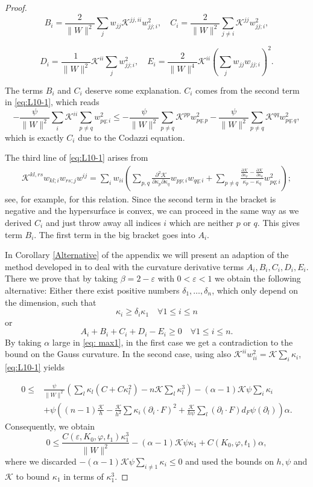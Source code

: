 \documentclass{amsart}
\theoremstyle{definition}
\theoremstyle{remark}
\numberwithin{equation}{section}
\begin{document}
\begin{proof}
\[B_i=\frac{2}{\|W\|^2}\sum_{j}w_{jj}\mathcal{K}^{jj,ii}w^2_{jj;i},\quad C_i=\frac{2}{\|W\|^2}\sum_{j\neq i}\mathcal{K}^{jj}w_{jj;i}^2,\]

\[D_i=\frac{1}{\|W\|^2}\mathcal{K}^{ii}\sum_j w_{jj;i}^2,\quad
E_i=\frac{2}{\|W\|^4}\mathcal{K}^{ii}\left(\sum_j w_{jj}w_{jj;i}\right)^2.\]

The terms $B_i$ and $C_i$ deserve some explanation. $C_i$ comes from the second term in \eqref{eq:L10-1}, which reads
\[-\frac{\psi}{\|W\|^2}\sum_i\mathcal{K}^{ii}\sum_{p\neq q}w_{pq;i}^2\leq -\frac{\psi}{\|W\|^2}\sum_{p\neq q}\mathcal{K}^{pp}w_{pq;p}^2-\frac{\psi}{\|W\|^2}\sum_{p\neq q}\mathcal{K}^{qq}w_{pq;q}^2, \]
which is exactly $C_i$ due to the Codazzi equation.

The third line of \eqref{eq:L10-1} arises from
\begin{align*}
\mathcal{K}^{kl,rs}w_{kl;i}w_{rs;j}w^{ij}=\sum_i w_{ii}\left(\sum_{p,q}\frac{\partial^2\mathcal{K}}{\partial \kappa_p\partial\kappa_q}w_{pp;i}w_{qq;i}+\sum_{p\neq q}\frac{\frac{\partial\mathcal{K}}{\partial \kappa_p}-\frac{\partial\mathcal{K}}{\partial\kappa_q}}{\kappa_p-\kappa_q} w_{pq;i}^2\right);
\end{align*}
see, for example, \cite[Lemma~2.1.14]{Gerhardt:/2006} for this relation. Since the second term in the bracket is negative and the hypersurface is convex, we can proceed in the same way as we derived $C_i$ and just throw away all indices $i$ which are neither $p$ or $q$. This gives term $B_i$. The first term in the big bracket goes into $A_i$.


In Corollary \ref{Alternative} of the appendix we will present an adaption of the method developed in \cite{Guan} to deal with the curvature derivative terms $A_i,B_i,C_i,D_i,E_i$. There we prove that by taking $\beta=2-\varepsilon$ with $0<\varepsilon<1$ we obtain the following alternative: Either there exist positive numbers $\delta_1,\dots,\delta_n$, which only depend on the dimension, such that
\[\kappa_i\geq \delta_i\kappa_1\quad\forall 1\leq i\leq n\]
or
\[A_i+B_i+C_i+D_i-E_i\geq 0\quad\forall 1\leq i\leq n.\]
By taking $\alpha$ large in \eqref{eq: max1}, in the first case we get a contradiction to the bound on the Gauss curvature. In the second case, using also $\mathcal{K}^{ii}w_{ii}^2 = \mathcal{K} \sum_i \kappa_i$, \eqref{eq:L10-1} yields

\begin{align*}
0 \leq& \frac{\psi}{\|W\|^2}\left(\sum_l \kappa_l(C + C \kappa_l^2) - n \mathcal{K} \sum_l \kappa_l^3\right)- (\alpha-1) \mathcal{K} \psi \sum_i \kappa_i \\
& + \psi \left((n-1)\frac{\mathcal{K}}{h} - \frac{\mathcal{K}}{h^2} \sum \kappa_i (\partial_i \cdot F)^2 + \frac{\mathcal{K}}{h\psi} \sum_l  (\partial_l \cdot F) d_F \psi (\partial_l) \right) \alpha.
\end{align*}
Consequently, we obtain
\[0\leq \frac{C(\varepsilon,K_0,\varphi,t_1)\kappa_1^3}{\|W\|^2} - (\alpha-1) \mathcal{K}\psi \kappa_1 + C(K_0,\varphi,t_1) \alpha,\]
where we discarded $-(\alpha-1)\mathcal{K}\psi \sum_{i\neq 1} \kappa_i \leq 0$ and used the bounds on $h, \psi$ and $\mathcal{K}$ to bound $\kappa_1$ in terms of $\kappa_1^3$.


\end{proof}
\end{document}
